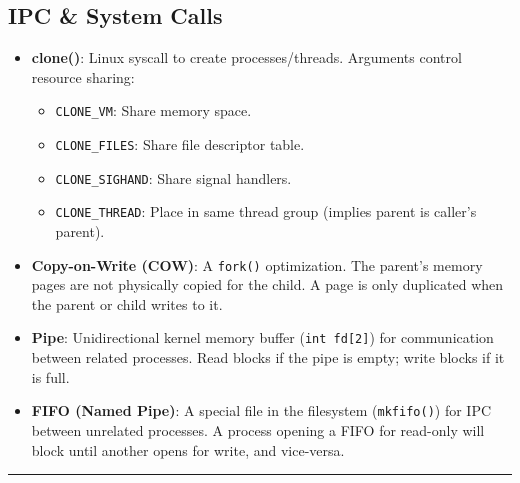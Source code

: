 \documentclass[8pt,a4paper]{article}
\newcommand{\sectiondivider}{\vspace{4pt}\hrule\vspace{4pt}}
\begin{document}
\begin{multicols}{2}
\section*{IPC \& System Calls}
\begin{itemize}
    \item \textbf{clone()}: Linux syscall to create processes/threads. Arguments control resource sharing:
        \begin{itemize}
            \item \texttt{CLONE\_VM}: Share memory space.
            \item \texttt{CLONE\_FILES}: Share file descriptor table.
            \item \texttt{CLONE\_SIGHAND}: Share signal handlers.
            \item \texttt{CLONE\_THREAD}: Place in same thread group (implies parent is caller's parent).
        \end{itemize}
    \item \textbf{Copy-on-Write (COW)}: A \texttt{fork()} optimization. The parent's memory pages are not physically copied for the child. A page is only duplicated when the parent or child writes to it.
    \item \textbf{Pipe}: Unidirectional kernel memory buffer (\texttt{int fd[2]}) for communication between related processes. Read blocks if the pipe is empty; write blocks if it is full.
    \item \textbf{FIFO (Named Pipe)}: A special file in the filesystem (\texttt{mkfifo()}) for IPC between unrelated processes. A process opening a FIFO for read-only will block until another opens for write, and vice-versa.
\end{itemize}

\sectiondivider

\end{multicols}
\end{document}
